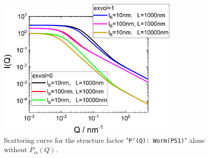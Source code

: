 \begin{figure}[htb]
\begin{center}
\includegraphics[width=0.8\textwidth]{../images/form_factor/polymer_semiflexible/PprimeWormPS1.png}
\end{center}
\caption{Scattering curve for the structure factor "\texttt{P'(Q): Worm(PS1)}" alone without $P_\mathrm{cs}(Q)$.}
\label{fig_IQ:PprimeWormPS1}
\end{figure}

\clearpage
